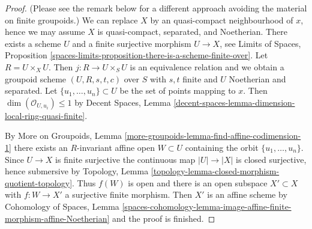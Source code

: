 \documentclass{stacks-project}
\theoremstyle{plain}
\theoremstyle{definition}
\theoremstyle{remark}
\numberwithin{equation}{subsection}
\begin{document}
\begin{proof}
(Please see the remark below for a different approach avoiding the material on
finite groupoids.) We can replace $X$ by an quasi-compact neighbourhood of
$x$, hence we may assume $X$ is quasi-compact, separated, and Noetherian.
There exists a scheme $U$ and a finite surjective morphism $U \to X$,
see Limits of Spaces, Proposition
\ref{spaces-limits-proposition-there-is-a-scheme-finite-over}.
Let $R = U \times_X U$. Then $j : R \to U \times_S U$ is an equivalence
relation and we obtain a groupoid scheme $(U, R, s, t, c)$ over $S$
with $s, t$ finite and $U$ Noetherian and separated.
Let $\{u_1, \ldots, u_n\} \subset U$ be the set of points mapping to $x$. 
Then $\dim(\mathcal{O}_{U, u_i}) \leq 1$ by
Decent Spaces, Lemma
\ref{decent-spaces-lemma-dimension-local-ring-quasi-finite}.

\medskip\noindent
By More on Groupoids, Lemma
\ref{more-groupoids-lemma-find-affine-codimension-1}
there exists an $R$-invariant affine open $W \subset U$ containing
the orbit $\{u_1, \ldots, u_n\}$. Since $U \to X$ is finite surjective
the continuous map $|U| \to |X|$ is closed surjective, hence
submersive by Topology, Lemma
\ref{topology-lemma-closed-morphism-quotient-topology}.
Thus $f(W)$ is open and there is an open subspace $X' \subset X$
with $f : W \to X'$ a surjective finite morphism.
Then $X'$ is an affine scheme by
Cohomology of Spaces, Lemma
\ref{spaces-cohomology-lemma-image-affine-finite-morphism-affine-Noetherian}
and the proof is finished.
\end{proof}
\end{document}
